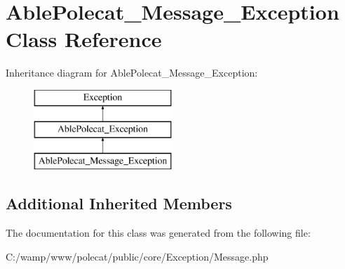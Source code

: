 \hypertarget{class_able_polecat___message___exception}{}\section{Able\+Polecat\+\_\+\+Message\+\_\+\+Exception Class Reference}
\label{class_able_polecat___message___exception}
Inheritance diagram for Able\+Polecat\+\_\+\+Message\+\_\+\+Exception\+:\begin{figure}[H]
\begin{center}
\leavevmode
\includegraphics[height=3.000000cm]{class_able_polecat___message___exception}
\end{center}
\end{figure}
\subsection*{Additional Inherited Members}


The documentation for this class was generated from the following file\+:\begin{DoxyCompactItemize}
\item 
C\+:/wamp/www/polecat/public/core/\+Exception/Message.\+php\end{DoxyCompactItemize}
